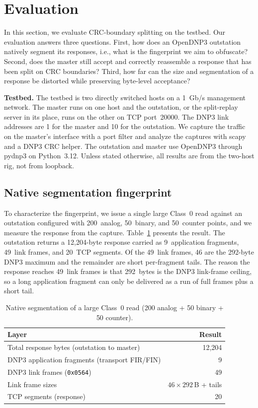 \documentclass[conference]{IEEEtran}
\newcommand{\code}[1]{\texttt{#1}}
\begin{document}
\section{Evaluation}

In this section, we evaluate CRC-boundary splitting on the testbed. Our
evaluation answers three questions. First, how does an OpenDNP3 outstation
natively segment its responses, i.e., what is the fingerprint we aim to
obfuscate? Second, does the master still accept and correctly reassemble a
response that has been split on CRC boundaries? Third, how far can the size and
segmentation of a response be distorted while preserving byte-level acceptance?

\noindent\textbf{Testbed.} The testbed is two directly switched hosts on a
1~Gb/s management network. The master runs on one host and the outstation, or the
split-replay server in its place, runs on the other on TCP port~20000. The DNP3
link addresses are 1 for the master and 10 for the outstation. We capture the
traffic on the master's interface with a port filter and analyze the captures
with scapy and a DNP3 CRC helper. The outstation and master use OpenDNP3 through
pydnp3 on Python~3.12. Unless stated otherwise, all results are from the two-host
rig, not from loopback.

\subsection{Native segmentation fingerprint}

To characterize the fingerprint, we issue a single large Class~0 read against an
outstation configured with 200~analog, 50~binary, and 50~counter points, and we
measure the response from the capture. Table~\ref{tab:baseline} presents the
result. The outstation returns a 12{,}204-byte response carried as
9~application fragments, 49~link frames, and 20~TCP segments. Of the 49~link
frames, 46 are the 292-byte DNP3 maximum and the remainder are short per-fragment
tails. The reason the response reaches 49~link frames is that 292~bytes is the
DNP3 link-frame ceiling, so a long application fragment can only be delivered as
a run of full frames plus a short tail.

\begin{table}[t]
\centering
\caption{Native segmentation of a large Class~0 read (200 analog + 50 binary +
50 counter).}
\label{tab:baseline}
\begin{tabular}{@{}p{}r@{}}
\toprule
Layer & Result \\
\midrule
Total response bytes (outstation to master) & 12{,}204 \\
DNP3 application fragments (transport FIR/FIN) & 9 \\
DNP3 link frames (\code{0x0564}) & 49 \\
Link frame sizes & $46 \times 292$\,B + tails \\
TCP segments (response) & 20 \\
\bottomrule
\end{tabular}
\end{table}
\end{document}
